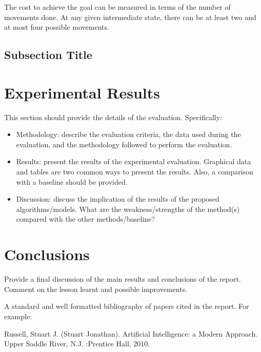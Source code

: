 \documentclass{svproc}
\begin{document}
The cost to achieve the goal can be measured in terms of the number of movements done. At any given intermediate state, there can be at least two and at most four possible movements.

\subsection{Subsection Title}

\section{Experimental Results}
This section should provide the details of the evaluation. Specifically:
\begin{itemize}
\item Methodology: describe the evaluation criteria, the data used during the evaluation, and the methodology followed to perform the evaluation. 
\item Results: present the results of the experimental evaluation. Graphical data and tables are two common ways to present the results. Also, a comparison with a baseline should be provided.
\item Discussion: discuss the implication of the results of the proposed algorithms/models. What are the weakness/strengths of the method(s) compared with the other methods/baseline?
\end{itemize}

\section{Conclusions}
Provide a final discussion of the main results and conclusions of the report. Comment on the lesson learnt and possible improvements.


A standard and well formatted bibliography of papers cited in the report. For example:

\begin{thebibliography}{6}
%

Russell, Stuart J. (Stuart Jonathan). Artificial Intelligence: a Modern Approach. Upper Saddle River, N.J.       :Prentice Hall, 2010.


\end{thebibliography}
\end{document}
